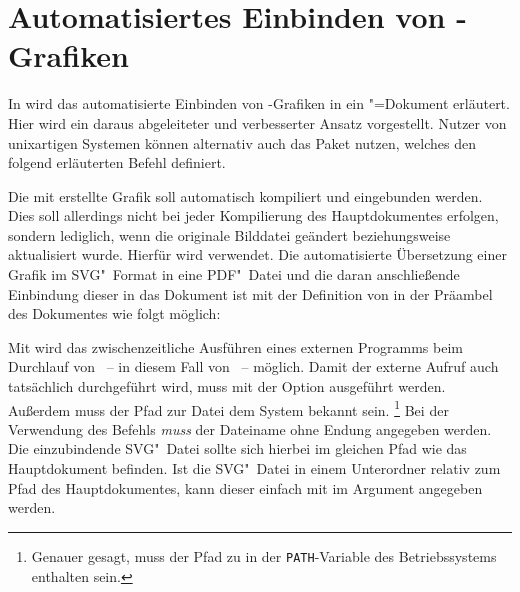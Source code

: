\section{Automatisiertes Einbinden von -Grafiken }
\label{sec:tips:svg}
In  wird das 
automatisierte Einbinden von -Grafiken in ein 
"=Dokument erläutert. Hier wird ein daraus abgeleiteter und 
verbesserter Ansatz vorgestellt. Nutzer von unixartigen Systemen können 
alternativ auch das Paket  nutzen, welches den folgend erläuterten 
Befehl  definiert.

Die mit  erstellte Grafik soll automatisch kompiliert und 
eingebunden werden. Dies soll allerdings nicht bei jeder Kompilierung des 
Hauptdokumentes erfolgen, sondern lediglich, wenn die originale Bilddatei 
geändert beziehungsweise aktualisiert wurde. Hierfür wird  
verwendet. Die automatisierte Übersetzung einer Grafik im SVG"~Format in eine 
PDF"~Datei und die daran anschließende Einbindung dieser in das Dokument ist 
mit der Definition von  
in der Präambel des Dokumentes wie folgt möglich:
%
\begin{quoting}
\end{quoting}
%
Mit  wird das 
zwischenzeitliche Ausführen eines externen Programms beim Durchlauf von 
~-- in diesem Fall von ~-- möglich. Damit 
der externe Aufruf auch tatsächlich durchgeführt wird, muss  
mit der Option  ausgeführt werden. Außerdem muss der 
Pfad zur Datei  dem System bekannt sein.%
\footnote{%
  Genauer gesagt, muss der Pfad zu  in der 
  \texttt{PATH}-Variable des Betriebssystems enthalten sein.
}
Bei der Verwendung des Befehls  \emph{muss} der Dateiname 
ohne Endung angegeben werden. Die einzubindende SVG"~Datei sollte sich hierbei 
im gleichen Pfad wie das Hauptdokument befinden. Ist die SVG"~Datei in einem 
Unterordner relativ zum Pfad des Hauptdokumentes, kann dieser einfach mit 
 im Argument 
angegeben werden.



